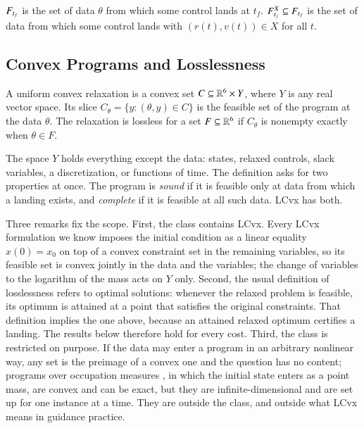 \begin{definition}
$F_{t_f}$ is the set of data $\theta$ from which some control lands at $t_f$. $F^{X}_{t_f}\subseteq F_{t_f}$ is the set of data from which
some control lands with $(r(t),v(t))\in X$ for all $t$.
\end{definition}

\subsection{Convex Programs and Losslessness}
\begin{definition}\label{def:program}
A uniform convex relaxation is a convex set $C\subseteq\mathbb{R}^6\times Y$, where $Y$ is any real vector space. Its slice
$C_\theta=\{y:(\theta,y)\in C\}$ is the feasible set of the program at the data $\theta$. The relaxation is lossless for a
set $F\subseteq\mathbb{R}^6$ if $C_\theta$ is nonempty exactly when $\theta\in F$.
\end{definition}
The space $Y$ holds everything except the data: states, relaxed controls, slack variables, a discretization, or functions of
time. The definition asks for two properties at once. The program is \emph{sound} if it is feasible only at data from which
a landing exists, and \emph{complete} if it is feasible at all such data. LCvx has both.

Three remarks fix the scope. First, the class contains LCvx. Every LCvx formulation we know imposes the initial condition as
a linear equality $x(0)=x_0$ on top of a convex constraint set in the remaining variables, so its feasible set is convex
jointly in the data and the variables; the change of variables to the logarithm of the mass \cite{acikmese2007} acts on
$Y$ only. Second, the usual definition of losslessness refers to optimal solutions: whenever the relaxed problem is feasible,
its optimum is attained at a point that satisfies the original constraints. That definition implies the one above, because an
attained relaxed optimum certifies a landing. The results below therefore hold for every cost. Third, the class is
restricted on purpose. If the data may enter a program in an arbitrary nonlinear way, any set is the preimage of a convex
one and the question has no content; programs over occupation measures \cite{lasserre2008}, in which the initial state
enters as a point mass, are convex and can be exact, but they are infinite-dimensional and are set up for one instance at a
time. They are outside the class, and outside what LCvx means in guidance practice.

